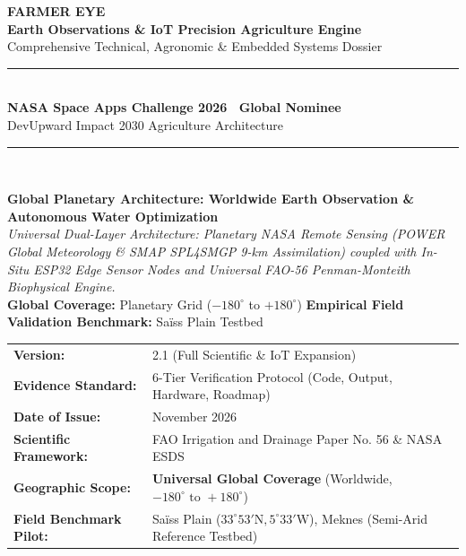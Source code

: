 \documentclass[11pt,a4paper,oneside]{report}
\begin{document}
\begin{titlepage}
    \centering
    \vspace*{1.5cm}
    
    {\Huge \bfseries \color{nasablue} FARMER EYE}\\[0.4cm]
    {\LARGE \textbf{Earth Observations \& IoT Precision Agriculture Engine}}\\[0.2cm]
    {\large \color{farmergreen} Comprehensive Technical, Agronomic \& Embedded Systems Dossier}\\[1.5cm]
    
    \rule{\linewidth}{1.2pt}\\[0.5cm]
    {\large \textbf{NASA Space Apps Challenge 2026 \textbar\ Global Nominee}}\\[0.2cm]
    {\small DevUpward Impact 2030 Agriculture Architecture}\\[0.5cm]
    \rule{\linewidth}{1.2pt}\\[2cm]
    
    \begin{tcolorbox}[enhanced,colback=bglight,colframe=nasablue,arc=3mm,boxrule=1pt,width=0.92\linewidth]
    \centering\small
    \textbf{Global Planetary Architecture: Worldwide Earth Observation \& Autonomous Water Optimization}\\[0.2cm]
    \textit{Universal Dual-Layer Architecture: Planetary NASA Remote Sensing (POWER Global Meteorology \& SMAP SPL4SMGP 9-km Assimilation) coupled with In-Situ ESP32 Edge Sensor Nodes and Universal FAO-56 Penman-Monteith Biophysical Engine.}\\[0.15cm]
    \footnotesize\textbf{Global Coverage:} Planetary Grid ($-180^\circ$ to $+180^\circ$) \quad\textbar\quad \textbf{Empirical Field Validation Benchmark:} Saïss Plain Testbed
    \end{tcolorbox}
    
    \vfill
    
    \begin{tabularx}{0.85\linewidth}{lX}
    \textbf{Version:} & 2.1 (Full Scientific \& IoT Expansion) \\
    \textbf{Evidence Standard:} & 6-Tier Verification Protocol (Code, Output, Hardware, Roadmap) \\
    \textbf{Date of Issue:} & November 2026 \\
    \textbf{Scientific Framework:} & FAO Irrigation and Drainage Paper No. 56 \& NASA ESDS \\
    \textbf{Geographic Scope:} & \textbf{Universal Global Coverage} (Worldwide, $-180^\circ \text{ to } +180^\circ$) \\
    \textbf{Field Benchmark Pilot:} & Saïss Plain ($33^\circ 53' \text{N}, 5^\circ 33' \text{W}$), Meknes (Semi-Arid Reference Testbed) \\
    \end{tabularx}
    
    \vspace*{1cm}
\end{titlepage}
\end{document}
